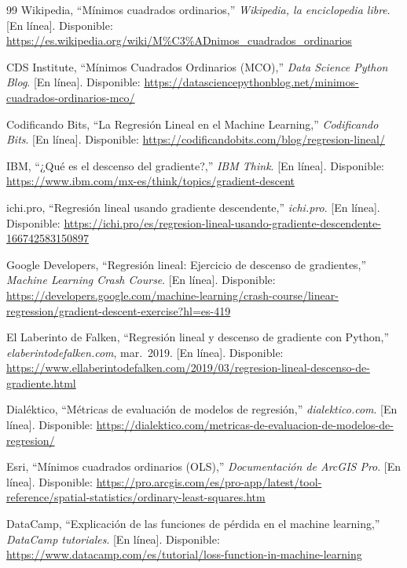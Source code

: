 \documentclass[11pt,a4paper]{article}
\begin{document}
\begin{thebibliography}{99}
 Wikipedia, ``Mínimos cuadrados ordinarios,'' \textit{Wikipedia, la enciclopedia libre}. [En línea]. Disponible: \url{https://es.wikipedia.org/wiki/M\%C3\%ADnimos_cuadrados_ordinarios}

 CDS Institute, ``Mínimos Cuadrados Ordinarios (MCO),'' \textit{Data Science Python Blog}. [En línea]. Disponible: \url{https://datasciencepythonblog.net/minimos-cuadrados-ordinarios-mco/}

 Codificando Bits, ``La Regresión Lineal en el Machine Learning,'' \textit{Codificando Bits}. [En línea]. Disponible: \url{https://codificandobits.com/blog/regresion-lineal/}

 IBM, ``¿Qué es el descenso del gradiente?,'' \textit{IBM Think}. [En línea]. Disponible: \url{https://www.ibm.com/mx-es/think/topics/gradient-descent}

 ichi.pro, ``Regresión lineal usando gradiente descendente,'' \textit{ichi.pro}. [En línea]. Disponible: \url{https://ichi.pro/es/regresion-lineal-usando-gradiente-descendente-166742583150897}

 Google Developers, ``Regresión lineal: Ejercicio de descenso de gradientes,'' \textit{Machine Learning Crash Course}. [En línea]. Disponible: \url{https://developers.google.com/machine-learning/crash-course/linear-regression/gradient-descent-exercise?hl=es-419}

 El Laberinto de Falken, ``Regresión lineal y descenso de gradiente con Python,'' \textit{elaberintodefalken.com}, mar.\ 2019. [En línea]. Disponible: \url{https://www.ellaberintodefalken.com/2019/03/regresion-lineal-descenso-de-gradiente.html}

 Dialéktico, ``Métricas de evaluación de modelos de regresión,'' \textit{dialektico.com}. [En línea]. Disponible: \url{https://dialektico.com/metricas-de-evaluacion-de-modelos-de-regresion/}

 Esri, ``Mínimos cuadrados ordinarios (OLS),'' \textit{Documentación de ArcGIS Pro}. [En línea]. Disponible: \url{https://pro.arcgis.com/es/pro-app/latest/tool-reference/spatial-statistics/ordinary-least-squares.htm}

 DataCamp, ``Explicación de las funciones de pérdida en el machine learning,'' \textit{DataCamp tutoriales}. [En línea]. Disponible: \url{https://www.datacamp.com/es/tutorial/loss-function-in-machine-learning}


\end{thebibliography}
\end{document}
